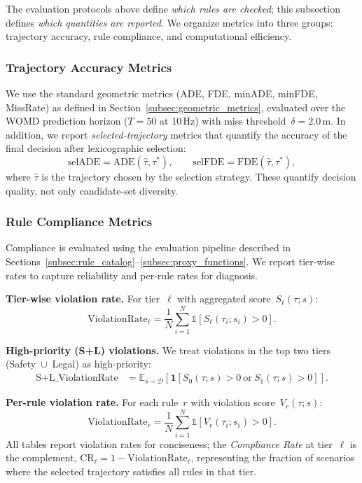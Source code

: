 The evaluation protocols above define \emph{which rules are checked}; this subsection defines \emph{which quantities are reported}.  We organize metrics into three groups: trajectory accuracy, rule compliance, and computational efficiency.

\subsubsection{Trajectory Accuracy Metrics}

We use the standard geometric metrics (ADE, FDE, minADE, minFDE, MissRate) as defined in Section~\ref{subsec:geometric_metrics}, evaluated over the WOMD prediction horizon ($T{=}50$ at 10\,Hz) with miss threshold~$\delta = 2.0\,\text{m}$.  In addition, we report \emph{selected-trajectory} metrics that quantify the accuracy of the final decision after lexicographic selection:
\begin{equation}
\text{selADE} = \text{ADE}(\hat{\tau}, \tau^*), \qquad
\text{selFDE} = \text{FDE}(\hat{\tau}, \tau^*),
\end{equation}
where $\hat{\tau}$ is the trajectory chosen by the selection strategy.  These quantify decision quality, not only candidate-set diversity. 
\subsubsection{Rule Compliance Metrics}

Compliance is evaluated using the evaluation pipeline described in Sections~\ref{subsec:rule_catalog}--\ref{subsec:proxy_functions}.  We report tier-wise rates to capture reliability and per-rule rates for diagnosis.

\textbf{Tier-wise violation rate.}
For tier~$\ell$ with aggregated score~$S_\ell(\tau; s)$:
\begin{equation}
\text{ViolationRate}_\ell
= \frac{1}{N} \sum_{i=1}^{N} \mathbb{1}\!\left[S_\ell(\tau_i; s_i) > 0\right].
\end{equation}

\textbf{High-priority (S+L) violations.}
We treat violations in the top two tiers (Safety~$\cup$~Legal) as high-priority:
\begin{align}
\text{S{+}L\_ViolationRate}
&=\mathbb{E}_{s \sim \mathcal{D}} \left[
\mathbf{1}\!\left[S_0(\tau; s) > 0 \ \text{or}\ S_1(\tau; s) > 0\right]
\right].\nonumber
\end{align}

\textbf{Per-rule violation rate.}
For each rule~$r$ with violation score~$V_r(\tau; s)$:
\begin{equation}
\text{ViolationRate}_r
= \frac{1}{N} \sum_{i=1}^{N} \mathbb{1}\!\left[V_r(\tau_i; s_i) > 0\right].
\end{equation}
\noindent All tables report violation rates for conciseness; the \emph{Compliance Rate} at tier~$\ell$ is the complement, $\text{CR}_\ell = 1 - \text{ViolationRate}_\ell$, representing the fraction of scenarios where the selected trajectory satisfies all rules in that tier.

